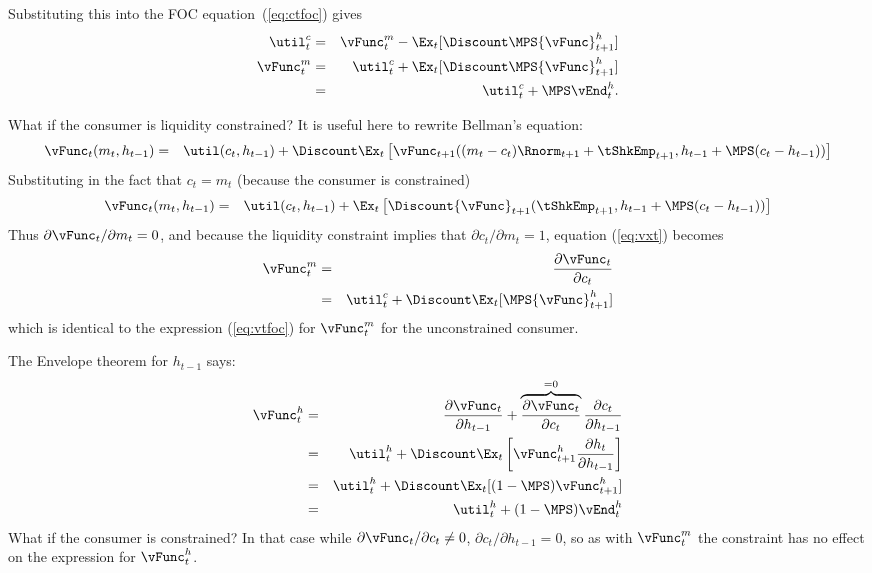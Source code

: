 \documentclass[titlepage]{\econtex}
\begin{document}
{Substituting this into the FOC equation~(\ref{eq:ctfoc}) gives
\begin{eqnarray}
\util^{c}_{t} & = & {\vFunc}_{t}^{m}-\Ex_{t}[\Discount \MPS {\vFunc}_{t+1}^{h}] \label{eq:ctfocsubx}
\\ {\vFunc}_{t}^{m} & = & \util^{c}_{t}+\Ex_{t}[\Discount \MPS {\vFunc}_{t+1}^{h}] \label{eq:vtfoc}
\\           & = & \util^{c}_{t}+\MPS \vEnd_{t}^{h} \label{eq:vxtformula}.
\end{eqnarray}

What if the consumer is liquidity constrained?  It is useful here to 
rewrite Bellman's equation:
\begin{eqnarray}
{\vFunc}_{t}({m}_{t},h_{t-1}) & = & \util({c}_{t},h_{t-1}) +  \Discount \Ex_{t}
\left[{\vFunc}_{t+1}(({m}_{t}-{c}_{t})\Rnorm_{t+1}+{\tShkEmp}_{t+1},h_{t-1}+\MPS({c}_{t}-h_{t-1}))
\right] \nonumber
\end{eqnarray}
Substituting in the fact that ${c}_{t}={m}_{t}$ (because the consumer is constrained)
\begin{eqnarray}
{\vFunc}_{t}({m}_{t},h_{t-1}) & = & \util({c}_{t},h_{t-1}) +  \Ex_{t}\left[\Discount
{\vFunc}_{t+1}({\tShkEmp}_{t+1},h_{t-1}+\MPS({c}_{t}-h_{t-1}))\right]
\nonumber
\end{eqnarray}
Thus $\partial {\vFunc}_{t}/\partial {m}_{t} = 0$, and because the liquidity
constraint implies that $\partial {c}_{t}/\partial {m}_{t} = 1$,
equation (\ref{eq:vxt}) becomes
\begin{eqnarray}
        {\vFunc}_{t}^{m}  & = &  \frac{\partial {\vFunc}_{t}}{\partial {c}_{t}}
\\             & = & \util_{t}^{c} + \Discount \Ex_{t} [\MPS {\vFunc}_{t+1}^{h}]
\end{eqnarray}
which is identical to the expression (\ref{eq:vtfoc}) for ${\vFunc}_{t}^{m}$
for the unconstrained consumer.

The Envelope theorem for $h_{t-1}$ says:
\begin{eqnarray}
{\vFunc}_{t}^{h} & = & \frac{\partial {\vFunc}_{t}}{\partial h_{t-1}} + \overbrace{\frac{\partial {\vFunc}_{t}}{\partial {c}_{t}}}^{=0}\frac{\partial {c}_{t}}{\partial h_{t-1}} \nonumber
\\ & = & \util^{h}_{t} + \Discount \Ex_{t} \left[{\vFunc}_{t+1}^{h}\frac{\partial h_{t}}{\partial h_{t-1}} \right]\nonumber
\\ & = & \util^{h}_{t} + \Discount \Ex_{t} [(1-\MPS) {\vFunc}_{t+1}^{h}] \nonumber
\\ & = & \util^{h}_{t} + (1-\MPS) \vEnd_{t}^{h} \label{eq:vhtformula}
\end{eqnarray}
What if the consumer is constrained?  In that case while $\partial
{\vFunc}_{t}/\partial {c}_{t} \neq 0$, $\partial {c}_{t}/\partial h_{t-1} = 0$, so as
with ${\vFunc}_{t}^{m}$ the constraint has no effect on the expression for ${\vFunc}^{h}_{t}$.

}
\end{document}
